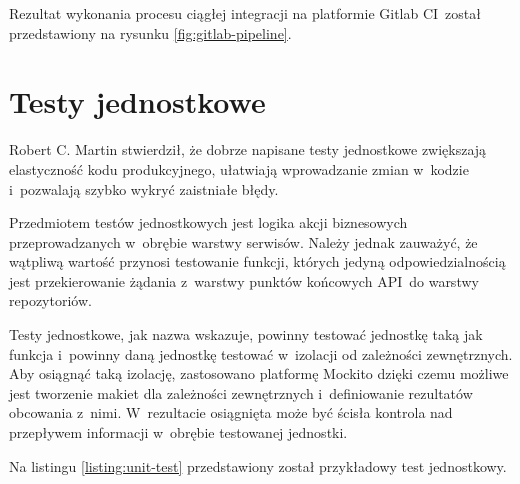 \par
Rezultat wykonania procesu ciągłej integracji na platformie Gitlab CI~został przedstawiony na rysunku \ref{fig:gitlab-pipeline}.


\section{Testy jednostkowe}

Robert C. Martin stwierdził, że dobrze napisane testy jednostkowe zwiększają elastyczność kodu produkcyjnego,
ułatwiają wprowadzanie zmian w~kodzie i~pozwalają szybko wykryć zaistniałe błędy\cite{book:czysty-kod}.

\par
Przedmiotem testów jednostkowych jest logika akcji biznesowych przeprowadzanych w~obrębie warstwy serwisów.
Należy jednak zauważyć, że wątpliwą wartość przynosi testowanie funkcji,
których jedyną odpowiedzialnością jest przekierowanie żądania z~warstwy punktów końcowych API~do warstwy repozytoriów.

\par
Testy jednostkowe, jak nazwa wskazuje, powinny testować jednostkę taką jak funkcja i~powinny daną jednostkę testować w~izolacji od zależności zewnętrznych\cite{book:testy-jednostkowe}.
Aby osiągnąć taką izolację, zastosowano platformę Mockito dzięki czemu możliwe jest tworzenie makiet dla zależności zewnętrznych i~definiowanie rezultatów obcowania z~nimi.
W~rezultacie osiągnięta może być ścisła kontrola nad przepływem informacji w~obrębie testowanej jednostki.

\par
Na listingu \ref{listing:unit-test} przedstawiony został przykładowy test jednostkowy.

